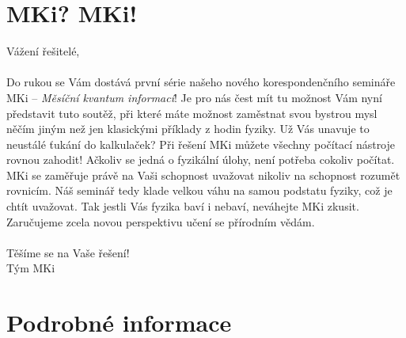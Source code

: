 \documentclass{article}
\begin{document}
\section*{MKi? MKi!}
Vážení řešitelé,
\\\\
Do rukou se Vám dostává první série našeho nového korespondenčního semináře MKi – \textit{Měsíční kvantum informací}!
Je pro nás čest mít tu možnost Vám nyní představit tuto soutěž,
při které máte možnost zaměstnat svou bystrou mysl něčím jiným než jen klasickými příklady z hodin fyziky.
Už Vás unavuje to neustálé ťukání do kalkulaček? Při řešení MKi můžete všechny počítací nástroje rovnou zahodit!
Ačkoliv se jedná o fyzikální úlohy, není potřeba cokoliv počítat.
MKi se zaměřuje právě na Vaši schopnost uvažovat nikoliv na schopnost rozumět rovnicím.
Náš seminář tedy klade velkou váhu na samou podstatu fyziky, což je chtít uvažovat. Tak jestli Vás fyzika baví i nebaví, neváhejte MKi zkusit.
Zaručujeme zcela novou perspektivu učení se přírodním vědám.
\\\\
Těšíme se na Vaše řešení!
\\
Tým MKi

\section*{Podrobné informace}
\end{document}
